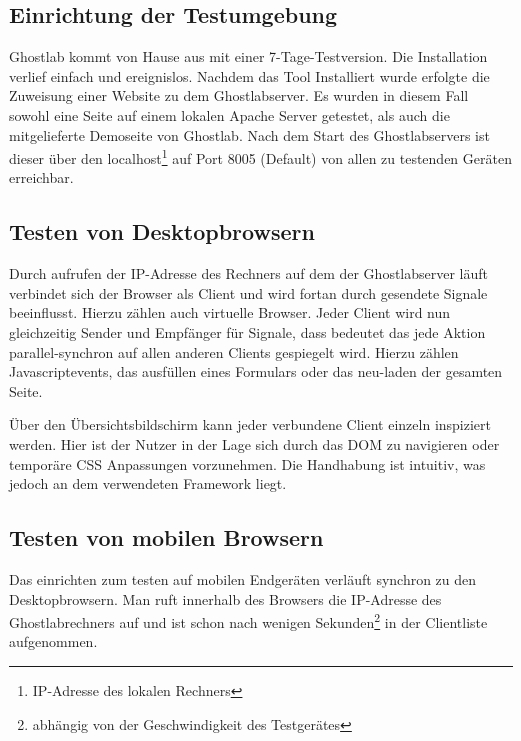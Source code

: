 		\subsection {Einrichtung der Testumgebung}
		Ghostlab kommt von Hause aus mit einer 7-Tage-Testversion. Die Installation verlief einfach und ereignislos. Nachdem das 		Tool Installiert wurde erfolgte die Zuweisung einer Website zu dem Ghostlabserver. Es wurden in diesem Fall sowohl eine 		Seite auf einem lokalen Apache Server getestet, als auch die mitgelieferte Demoseite von Ghostlab. Nach dem Start des 			Ghostlabservers ist dieser über den localhost\footnote{IP-Adresse des lokalen Rechners} auf Port 8005 (Default) von allen 		zu testenden Geräten erreichbar.
		
		\subsection{Testen von Desktopbrowsern}
		Durch aufrufen der IP-Adresse des Rechners auf dem der Ghostlabserver läuft verbindet sich der Browser als Client und 			wird fortan durch gesendete Signale beeinflusst. Hierzu zählen auch virtuelle Browser. Jeder Client wird nun gleichzeitig 			Sender und Empfänger für Signale, dass bedeutet das jede Aktion parallel-synchron auf allen anderen Clients gespiegelt 			wird. Hierzu zählen Javascriptevents, das ausfüllen eines Formulars oder das neu-laden der gesamten Seite.
		
		Über den Übersichtsbildschirm kann jeder verbundene Client einzeln inspiziert werden. Hier ist der Nutzer in der Lage sich 		durch das DOM zu navigieren oder temporäre CSS Anpassungen vorzunehmen. Die Handhabung ist intuitiv, was jedoch an 		dem verwendeten Framework  liegt.
		
		\pagebreak
		\subsection{Testen von mobilen Browsern}
		
		Das einrichten zum testen auf mobilen Endgeräten verläuft synchron zu den Desktopbrowsern. Man ruft innerhalb des 			Browsers die IP-Adresse des Ghostlabrechners auf und ist schon nach wenigen Sekunden\footnote{abhängig von der 			Geschwindigkeit des Testgerätes} in der Clientliste aufgenommen.
		
